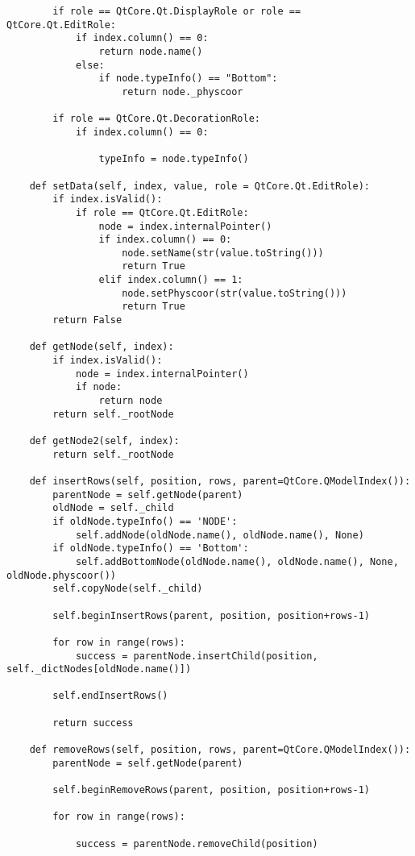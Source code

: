 \begin{verbatim}
        if role == QtCore.Qt.DisplayRole or role == QtCore.Qt.EditRole:
            if index.column() == 0:
                return node.name()
            else:
                if node.typeInfo() == "Bottom":
                    return node._physcoor

        if role == QtCore.Qt.DecorationRole:
            if index.column() == 0:

                typeInfo = node.typeInfo()

    def setData(self, index, value, role = QtCore.Qt.EditRole):
        if index.isValid():
            if role == QtCore.Qt.EditRole:
                node = index.internalPointer()
                if index.column() == 0:
                    node.setName(str(value.toString()))
                    return True
                elif index.column() == 1:
                    node.setPhyscoor(str(value.toString()))
                    return True
        return False

    def getNode(self, index):
        if index.isValid():
            node = index.internalPointer()
            if node:
                return node
        return self._rootNode

    def getNode2(self, index):
        return self._rootNode

    def insertRows(self, position, rows, parent=QtCore.QModelIndex()):
        parentNode = self.getNode(parent)
        oldNode = self._child
        if oldNode.typeInfo() == 'NODE':
            self.addNode(oldNode.name(), oldNode.name(), None)    
        if oldNode.typeInfo() == 'Bottom':
            self.addBottomNode(oldNode.name(), oldNode.name(), None, oldNode.physcoor())
        self.copyNode(self._child)

        self.beginInsertRows(parent, position, position+rows-1)

        for row in range(rows):
            success = parentNode.insertChild(position, self._dictNodes[oldNode.name()])  

        self.endInsertRows()

        return success

    def removeRows(self, position, rows, parent=QtCore.QModelIndex()):
        parentNode = self.getNode(parent)
                
        self.beginRemoveRows(parent, position, position+rows-1)

        for row in range(rows):
            
            success = parentNode.removeChild(position)


\end{verbatim}

